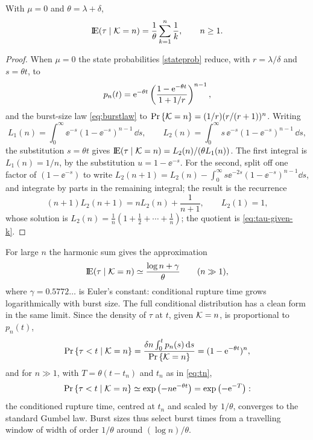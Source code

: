 \begin{proposition}[Conditional rupture time, $\mu=0$]
\label{prop:tau-given-k}
With $\mu=0$ and $\theta=\lambda+\delta$,
\begin{equation}
{\rm I}\!{\rm E}(\tau\mid\mathcal{K}=n)=\frac{1}{\theta}\sum_{k=1}^{n}\frac{1}{k},
\qquad n\ge1.
\label{eq:tau-given-k}
\end{equation}
\end{proposition}

\begin{proof}
When $\mu=0$ the state probabilities \eqref{stateprob} reduce, with
$r=\lambda/\delta$ and $s=\theta t$, to
$$p_n(t)={\rm e}^{-\theta t}\left(\frac{1-{\rm e}^{-\theta t}}{1+1/r}\right)^{n-1},$$
and the burst-size law \eqref{eq:burstlaw} to
${\text{Pr}\left\{\mathcal{K}=n\right\}}=(1/r)(r/(r+1))^n$. Writing
$$L_1(n)=\int_0^\infty \ee^{-s}(1-\ee^{-s})^{n-1}\,\dd s,\qquad
L_2(n)=\int_0^\infty s\,\ee^{-s}(1-\ee^{-s})^{n-1}\,\dd s,$$
the substitution $s=\theta t$ gives
${\rm I}\!{\rm E}(\tau\mid\mathcal{K}=n)=L_2(n)/(\theta L_1(n))$. The first integral is
$L_1(n)=1/n$, by the substitution $u=1-\ee^{-s}$. For the second, split off
one factor of $(1-\ee^{-s})$ to write
$L_2(n+1)=L_2(n)-\int_0^\infty s\ee^{-2s}(1-\ee^{-s})^{n-1}\dd s$, and
integrate by parts in the remaining integral; the result is the recurrence
$$(n+1)L_2(n+1)=nL_2(n)+\frac{1}{n+1},\qquad L_2(1)=1,$$
whose solution is $L_2(n)=\frac{1}{n}(1+\frac12+\cdots+\frac1n)$; the
quotient is \eqref{eq:tau-given-k}.
\end{proof}

For large $n$ the harmonic sum gives the approximation
\begin{equation}
{\rm I}\!{\rm E}(\tau\mid\mathcal{K}=n)\simeq\frac{\log n+\gamma}{\theta}\qquad(n\gg1),
\label{eq:tau-given-k-asymp}
\end{equation}
where $\gamma=0.5772\ldots$ is Euler's constant: conditional rupture time
grows logarithmically with burst size. The full conditional distribution has
a clean form in the same limit. Since the density of $\tau$ at $t$, given
$\mathcal{K}=n$, is proportional to $p_n(t)$,
\begin{equation}
{\text{Pr}\left\{\tau<t\mid\mathcal{K}=n\right\}}
=\frac{\delta n\int_0^t p_n(s)\,{\rm d} s}{{\text{Pr}\left\{\mathcal{K}=n\right\}}}
=(1-{\rm e}^{-\theta t})^n,
\label{eq:cond-cdf}
\end{equation}
and for $n\gg1$, with $T=\theta(t-t_n)$ and $t_n$ as in \eqref{eq:tn},
\begin{equation}
{\text{Pr}\left\{\tau<t\mid\mathcal{K}=n\right\}}\simeq\exp\left(-n{\rm e}^{-\theta t}\right)
=\exp\left(-{\rm e}^{-T}\right):
\end{equation}
the conditioned rupture time, centred at $t_n$ and scaled by $1/\theta$,
converges to the standard Gumbel law. Burst sizes thus select burst times
from a travelling window of width of order $1/\theta$ around
$(\log n)/\theta$.

